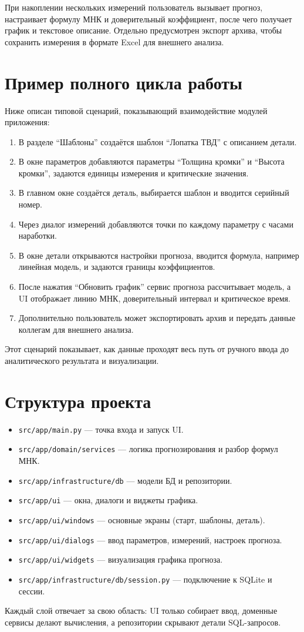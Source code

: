 \documentclass[12pt,a4paper]{article}
\begin{document}
При накоплении нескольких измерений пользователь вызывает прогноз, настраивает формулу МНК
и доверительный коэффициент, после чего получает график и текстовое описание.
Отдельно предусмотрен экспорт архива, чтобы сохранить измерения в формате Excel
для внешнего анализа.

\section*{Пример полного цикла работы}
Ниже описан типовой сценарий, показывающий взаимодействие модулей приложения:
\begin{enumerate}
  \item В разделе ``Шаблоны'' создаётся шаблон ``Лопатка ТВД'' с описанием детали.
  \item В окне параметров добавляются параметры ``Толщина кромки'' и ``Высота кромки'',
        задаются единицы измерения и критические значения.
  \item В главном окне создаётся деталь, выбирается шаблон и вводится серийный номер.
  \item Через диалог измерений добавляются точки по каждому параметру с часами наработки.
  \item В окне детали открываются настройки прогноза, вводится формула, например
        линейная модель, и задаются границы коэффициентов.
  \item После нажатия ``Обновить график'' сервис прогноза рассчитывает модель,
        а UI отображает линию МНК, доверительный интервал и критическое время.
  \item Дополнительно пользователь может экспортировать архив и передать данные
        коллегам для внешнего анализа.
\end{enumerate}
Этот сценарий показывает, как данные проходят весь путь от ручного ввода
до аналитического результата и визуализации.

\section*{Структура проекта}
\begin{itemize}
  \item \texttt{src/app/main.py} --- точка входа и запуск UI.
  \item \texttt{src/app/domain/services} --- логика прогнозирования и разбор формул МНК.
  \item \texttt{src/app/infrastructure/db} --- модели БД и репозитории.
  \item \texttt{src/app/ui} --- окна, диалоги и виджеты графика.
  \item \texttt{src/app/ui/windows} --- основные экраны (старт, шаблоны, деталь).
  \item \texttt{src/app/ui/dialogs} --- ввод параметров, измерений, настроек прогноза.
  \item \texttt{src/app/ui/widgets} --- визуализация графика прогноза.
  \item \texttt{src/app/infrastructure/db/session.py} --- подключение к SQLite и сессии.
\end{itemize}
Каждый слой отвечает за свою область: UI только собирает ввод, доменные сервисы
делают вычисления, а репозитории скрывают детали SQL-запросов.
\end{document}
